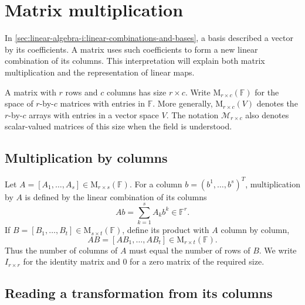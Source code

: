\section{Matrix multiplication}
\label{sec:linear-algebra-i:matrix-multiplication}

In \autoref{sec:linear-algebra-i:linear-combinations-and-bases}, a basis
described a vector by its coefficients. A matrix uses such coefficients
to form a new linear combination of its columns. This interpretation will
explain both matrix multiplication and the representation of linear maps.

A matrix with \(r\) rows and \(c\) columns has size \(r\times c\). Write
\(\mathrm M_{r\times c}(\mathbb F)\) for the space of \(r\)-by-\(c\)
matrices with entries in \(\mathbb F\). More generally,
\(\mathrm M_{r\times c}(V)\) denotes the \(r\)-by-\(c\) arrays with entries
in a vector space \(V\).
The notation \(\mathcal M_{r\times c}\) also denotes scalar-valued
matrices of this size when the field is understood.

\subsection{Multiplication by columns}

Let \(A=[A_1,\ldots,A_s]\in\mathrm M_{r\times s}(\mathbb F)\).
For a column \(b=(b^1,\ldots,b^s)^T\), multiplication by \(A\) is
defined by the linear combination of its columns
\[
  Ab=\sum_{k=1}^s A_kb^k\in\mathbb F^r.
\]
If \(B=[B_1,\ldots,B_t]\in\mathrm M_{s\times t}(\mathbb F)\),
define its product with \(A\) column by column,
\[
  AB=[AB_1,\ldots,AB_t]\in\mathrm M_{r\times t}(\mathbb F).
\]
Thus the number of columns of \(A\) must equal the number of rows of
\(B\). We write \(I_{r\times r}\) for the identity matrix and \(0\)
for a zero matrix of the required size.

\subsection{Reading a transformation from its columns}

